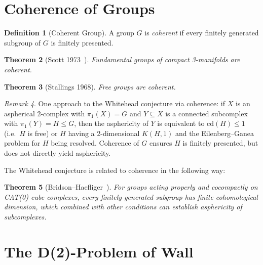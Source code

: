 \documentclass[12pt,a4paper]{amsart}
\newtheorem{theorem}{Theorem}[section]
\theoremstyle{definition}
\newtheorem{definition}[theorem]{Definition}
\theoremstyle{remark}
\newtheorem{remark}[theorem]{Remark}
\begin{document}
\section{Coherence of Groups}

\begin{definition}[Coherent Group]
A group $G$ is \emph{coherent} if every finitely generated subgroup
of $G$ is finitely presented.
\end{definition}

\begin{theorem}[Scott 1973~\cite{Scott1973}]
Fundamental groups of compact 3-manifolds are coherent.
\end{theorem}

\begin{theorem}[Stallings 1968]
Free groups are coherent.
\end{theorem}

\begin{remark}
One approach to the Whitehead conjecture via coherence: if $X$ is an
aspherical 2-complex with $\pi_1(X) = G$ and $Y \subseteq X$ is a
connected subcomplex with $\pi_1(Y) = H \leq G$, then the asphericity
of $Y$ is equivalent to $\mathrm{cd}(H) \leq 1$ (i.e.\ $H$ is free)
or $H$ having a 2-dimensional $K(H,1)$ and the Eilenberg--Ganea problem
for $H$ being resolved. Coherence of $G$ ensures $H$ is finitely
presented, but does not directly yield asphericity.
\end{remark}

The Whitehead conjecture is related to coherence in the following way:

\begin{theorem}[Bridson--Haefliger~\cite{BridsonHaefliger1999}]
For groups acting properly and cocompactly on CAT(0) cube complexes, every
finitely generated subgroup has finite cohomological dimension,
which combined with other conditions can establish asphericity of
subcomplexes.
\end{theorem}

\section{The D(2)-Problem of Wall}
\end{document}
